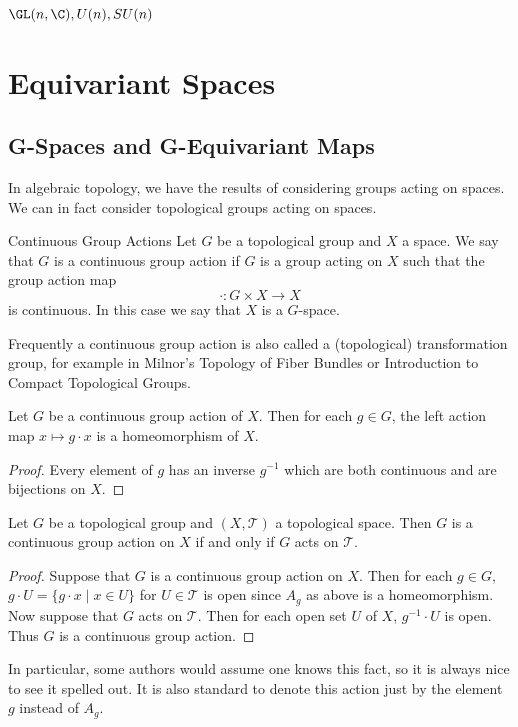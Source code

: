\documentclass[a4paper]{article}
\begin{document}
$\GL(n,\C), U(n), SU(n)$

\pagebreak
\section{Equivariant Spaces}
\subsection{G-Spaces and G-Equivariant Maps}
In algebraic topology, we have the results of considering groups acting on spaces. We can in fact consider topological groups acting on spaces. 

\begin{defn}{Continuous Group Actions}{} Let $G$ be a topological group and $X$ a space. We say that $G$ is a continuous group action if $G$ is a group acting on $X$ such that the group action map $$\cdot:G\times X\to X$$ is continuous. In this case we say that $X$ is a $G$-space. 
\end{defn}

Frequently a continuous group action is also called a (topological) transformation group, for example in Milnor's Topology of Fiber Bundles or Introduction to Compact Topological Groups. 

\begin{prp}{}{} Let $G$ be a continuous group action of $X$. Then for each $g\in G$, the left action map $x\mapsto g\cdot x$ is a homeomorphism of $X$. \tcbline
\begin{proof}
Every element of $g$ has an inverse $g^{-1}$ which are both continuous and are bijections on $X$. 
\end{proof}
\end{prp}

\begin{prp}{}{} Let $G$ be a topological group and $(X,\mathcal{T})$ a topological space. Then $G$ is a continuous group action on $X$ if and only if $G$ acts on $\mathcal{T}$. \tcbline
\begin{proof}
Suppose that $G$ is a continuous group action on $X$. Then for each $g\in G$, $g\cdot U=\{g\cdot x\;|\; x\in U\}$ for $U\in\mathcal{T}$ is open since $A_g$ as above is a homeomorphism. Now suppose that $G$ acts on $\mathcal{T}$. Then for each open set $U$ of $X$, $g^{-1}\cdot U$ is open. Thus $G$ is a continuous group action. 
\end{proof}
\end{prp}

In particular, some authors would assume one knows this fact, so it is always nice to see it spelled out. It is also standard to denote this action just by the element $g$ instead of $A_g$. 
\end{document}

